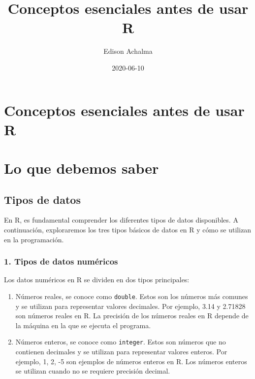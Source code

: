 \documentclass[
  jou,
  floatsintext,
  longtable,
  a4paper,
  nolmodern,
  notxfonts,
  notimes,
  12pt,
  colorlinks=true,linkcolor=blue,citecolor=blue,urlcolor=blue]{apa7}
\title{Conceptos esenciales antes de usar R}
\author{Edison Achalma}
\affiliation{
{Escuela Profesional de Economía, Universidad Nacional de San Cristóbal
de Huamanga}}
\date{2020-06-10}
\begin{document}
\maketitle


\hypertarget{toc}{}
\tableofcontents
\newpage
\section[Introduction]{Conceptos esenciales antes de usar R}

\setcounter{secnumdepth}{3}

\setlength\LTleft{0pt}




\section{Lo que debemos saber}\label{lo-que-debemos-saber}

\subsection{Tipos de datos}\label{tipos-de-datos}

En R, es fundamental comprender los diferentes tipos de datos
disponibles. A continuación, exploraremos los tres tipos básicos de
datos en R y cómo se utilizan en la programación.

\subsubsection{1. Tipos de datos
numéricos}\label{tipos-de-datos-numuxe9ricos}

Los datos numéricos en R se dividen en dos tipos principales:

\begin{enumerate}
\def\labelenumi{\alph{enumi}.}
\item
  Números reales, se conoce como \texttt{double}. Estos son los números
  más comunes y se utilizan para representar valores decimales. Por
  ejemplo, 3.14 y 2.71828 son números reales en R. La precisión de los
  números reales en R depende de la máquina en la que se ejecuta el
  programa.
\item
  Números enteros, se conoce como \texttt{integer}. Estos son números
  que no contienen decimales y se utilizan para representar valores
  enteros. Por ejemplo, 1, 2, -5 son ejemplos de números enteros en R.
  Los números enteros se utilizan cuando no se requiere precisión
  decimal.
\end{enumerate}
\end{document}
